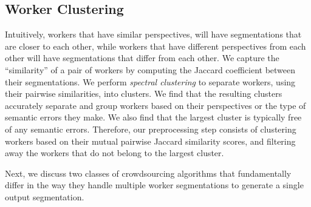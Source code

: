 \subsection{Worker Clustering}
Intuitively, workers that have similar perspectives, will have segmentations that are closer to each other, while workers that have different perspectives from each other will have segmentations that differ from each other. We capture the ``similarity'' of a pair of workers by computing the Jaccard coefficient between their segmentations. We perform {\em spectral clustering} to separate workers, using their pairwise similarities, into clusters. We find that the resulting clusters accurately separate and group workers based on their perspectives or the type of semantic errors they make. We also find that the largest cluster is typically free of any semantic errors. Therefore, our preprocessing step consists of clustering workers based on their mutual pairwise Jaccard similarity scores, and filtering away the workers that do not belong to the largest cluster. %

Next, we discuss two classes of crowdsourcing algorithms that fundamentally differ in the way they handle multiple worker segmentations to generate a single output segmentation.

